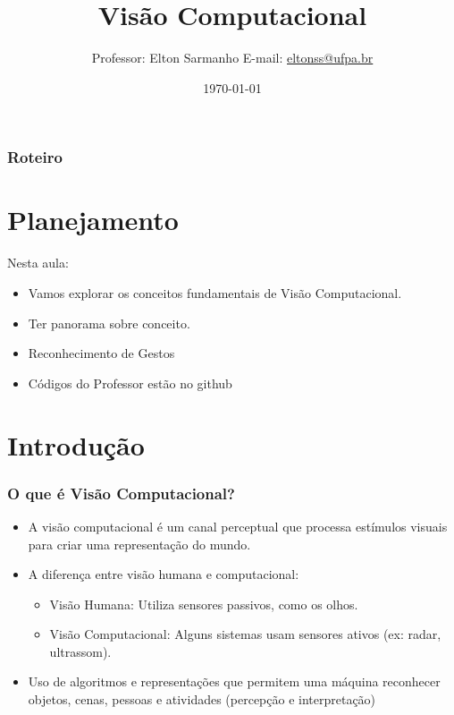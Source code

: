 \documentclass{beamer}
\title[]{Visão Computacional}
\author[Elton Sarmanho]{ 
Professor: Elton Sarmanho\inst{1} 
\newline
E-mail: \href{mailto:eltonss@ufpa.br}{eltonss@ufpa.br}\newline
\href{https://github.com/eltonsarmanho}{\faGithub} \href{https://www.linkedin.com/in/elton-sarmanho-836553185/}{\faLinkedinSquare}
}
\institute[UFRailwayPA]{
   \inst{1}%
     Faculdade de Sistemas de Informação - UFPA/CUNTINS
     }
\date{\today}
\begin{document}
\begin{frame}
\titlepage
\end{frame}

\begin{frame}
\frametitle{Roteiro}
\tableofcontents[sections={1-3}]
\end{frame}



\section{Planejamento}

\begin{frame}
Nesta aula:

\begin{itemize}
 \item Vamos explorar os conceitos fundamentais de Visão Computacional.
 \item Ter panorama sobre conceito.
 \item Reconhecimento de Gestos
 \item Códigos do Professor estão no github
\end{itemize}


\end{frame}

\section{Introdução}
\begin{frame}
\frametitle{O que é Visão Computacional?}
\begin{itemize}
    \item A visão computacional é um canal perceptual que processa estímulos visuais para criar uma representação do mundo.
    \item A diferença entre visão humana e computacional:
    \begin{itemize}
        \item Visão Humana: Utiliza sensores passivos, como os olhos.
        \item Visão Computacional: Alguns sistemas usam sensores ativos (ex: radar, ultrassom).
    \end{itemize}
    \item Uso de algoritmos e representações que permitem
uma máquina reconhecer objetos, cenas, pessoas e
atividades (percepção e interpretação)
\end{itemize}
\end{frame}
\end{document}
